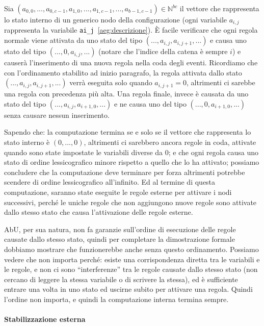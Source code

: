 \documentclass[12pt, a4paper]{article}
\begin{document}
Sia $(a_{0,0},...,a_{0,c-1},a_{1,0},...,a_{1,c-1},...,a_{b-1,c-1})\in \mathbb{N}^{bc}$ il vettore che rappresenta lo stato interno di un generico nodo della configurazione (ogni variabile $a_{i,j}$ rappresenta la variabile \lstinline{ai_j}~\ref{aeg:descrizione}). È facile verificare che ogni regola normale viene attivata da uno stato del tipo $(...,a_{i,j},a_{i,j+1},...)$ e causa uno stato del tipo $(...,0,a_{i,j},...)$ (notare che l'indice della catena è sempre $i$) e causerà l'inserimento di una nuova regola nella coda degli eventi.
Ricordiamo che con l'ordinamento stabilito ad inizio paragrafo, la regola attivata dallo stato $(...,a_{i,j},a_{i,j+1},...)$ verrà eseguita solo quando $a_{i,j+1}=0$, altrimenti ci sarebbe una regola con precedenza più alta.
Una regola finale, invece è causata da uno stato del tipo $(...,a_{i,j},a_{i+1,0},...)$ e ne causa uno del tipo $(...,0,a_{i+1,0},...)$ senza causare nessun inserimento.

Sapendo che: la computazione termina se e solo se il vettore che rappresenta lo stato interno è $(0,...,0)$, altrimenti ci sarebbero ancora regole in coda, attivate quando sono state impostate le variabili diverse da $0$; e che ogni regola causa uno stato di ordine lessicografico minore rispetto a quello che lo ha attivato; possiamo concludere che la computazione deve terminare per forza altrimenti potrebbe scendere di ordine lessicografico all'infinito.
Ed al termine di questa computazione, saranno state eseguite le regole esterne per attivare i nodi successivi, perché le uniche regole che non aggiungono nuove regole sono attivate dallo stesso stato che causa l'attivazione delle regole esterne.

AbU, per sua natura, non fa garanzie sull'ordine di esecuzione delle regole causate dallo stesso stato, quindi per completare la dimostrazione formale dobbiamo mostrare che funzionerebbe anche senza questo ordinamento.
Possiamo vedere che non importa perché: esiste una corrispondenza diretta tra le variabili e le regole, e non ci sono ``interferenze'' tra le regole causate dallo stesso stato (non cercano di leggere la stessa variabile o di scrivere la stessa), ed è sufficiente entrare una volta in uno stato ed uscirne subito per attivare una regola.
Quindi l'ordine non importa, e quindi la computazione interna termina sempre.\label{terminazione:interna:ordinamento}

\paragraph{Stabilizzazione esterna}
\end{document}
